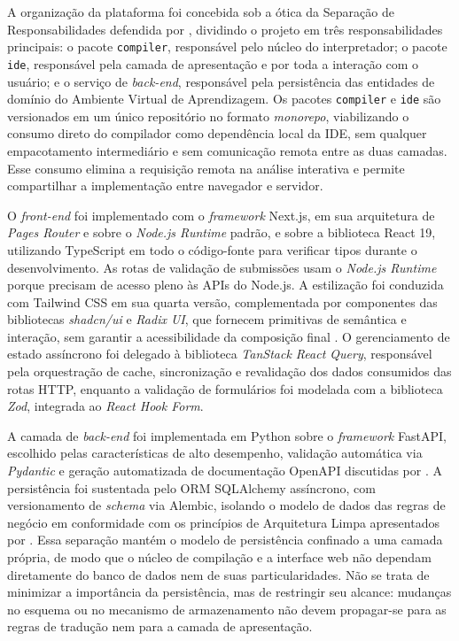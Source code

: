 A organização da plataforma foi concebida sob a ótica da Separação de Responsabilidades defendida por , dividindo o projeto em três responsabilidades principais: o pacote \texttt{compiler}, responsável pelo núcleo do interpretador; o pacote \texttt{ide}, responsável pela camada de apresentação e por toda a interação com o usuário; e o serviço de \textit{back-end}, responsável pela persistência das entidades de domínio do Ambiente Virtual de Aprendizagem. Os pacotes \texttt{compiler} e \texttt{ide} são versionados em um único repositório no formato \textit{monorepo}, viabilizando o consumo direto do compilador como dependência local da IDE, sem qualquer empacotamento intermediário e sem comunicação remota entre as duas camadas. Esse consumo elimina a requisição remota na análise interativa e permite compartilhar a implementação entre navegador e servidor.

O \textit{front-end} foi implementado com o \textit{framework} Next.js, em sua arquitetura de \textit{Pages Router} e sobre o \textit{Node.js Runtime} padrão, e sobre a biblioteca React 19, utilizando TypeScript em todo o código-fonte para verificar tipos durante o desenvolvimento. As rotas de validação de submissões usam o \textit{Node.js Runtime} porque precisam de acesso pleno às APIs do Node.js. A estilização foi conduzida com Tailwind CSS em sua quarta versão, complementada por componentes das bibliotecas \textit{shadcn/ui} e \textit{Radix UI}, que fornecem primitivas de semântica e interação, sem garantir a acessibilidade da composição final \cite{radixaccess2026}. O gerenciamento de estado assíncrono foi delegado à biblioteca \textit{TanStack React Query}, responsável pela orquestração de cache, sincronização e revalidação dos dados consumidos das rotas HTTP, enquanto a validação de formulários foi modelada com a biblioteca \textit{Zod}, integrada ao \textit{React Hook Form}.

A camada de \textit{back-end} foi implementada em Python sobre o \textit{framework} FastAPI, escolhido pelas características de alto desempenho, validação automática via \textit{Pydantic} e geração automatizada de documentação OpenAPI discutidas por . A persistência foi sustentada pelo ORM SQLAlchemy assíncrono, com versionamento de \textit{schema} via Alembic, isolando o modelo de dados das regras de negócio em conformidade com os princípios de Arquitetura Limpa apresentados por . Essa separação mantém o modelo de persistência confinado a uma camada própria, de modo que o núcleo de compilação e a interface web não dependam diretamente do banco de dados nem de suas particularidades. Não se trata de minimizar a importância da persistência, mas de restringir seu alcance: mudanças no esquema ou no mecanismo de armazenamento não devem propagar-se para as regras de tradução nem para a camada de apresentação.

